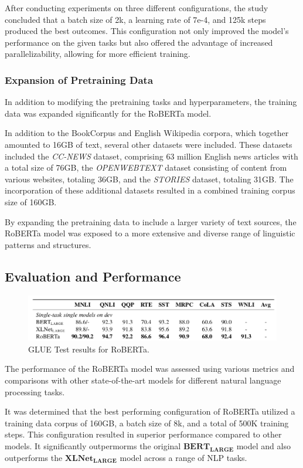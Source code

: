 \documentclass[a4paper,10pt]{report} %
\begin{document}
After conducting experiments on three different configurations, the study concluded that a batch size of 2k, a learning rate of 7e-4, and 125k steps produced the best outcomes. This configuration not only improved the model's performance on the given tasks but also offered the advantage of increased parallelizability, allowing for more efficient training. \cite{roberta}

\subsubsection{Expansion of Pretraining Data}
In addition to modifying the pretraining tasks and hyperparameters, the training data was expanded significantly for the RoBERTa model.

In addition to the BookCorpus and English Wikipedia corpora, which together amounted to 16GB of text, several other datasets were included. These datasets included the \textit{CC-NEWS} dataset, comprising 63 million English news articles with a total size of 76GB, the \textit{OPENWEBTEXT} dataset consisting of content from various websites, totaling 36GB, and the \textit{STORIES} dataset, totaling 31GB. The incorporation of these additional datasets resulted in a combined training corpus size of 160GB.

By expanding the pretraining data to include a larger variety of text sources, the RoBERTa model was exposed to a more extensive and diverse range of linguistic patterns and structures. \cite{roberta}

\subsection{Evaluation and Performance}
\begin{figure}
  \centering
  \includegraphics[width=12cm]{img/roberta_results.png}
  \caption{GLUE Test results for RoBERTa. \cite{roberta}}
  \label{fig:roberta_results}
\end{figure}
The performance of the RoBERTa model was assessed using various metrics and comparisons with other state-of-the-art models for different natural language processing tasks.

It was determined that the best performing configuration of RoBERTa utilized a training data corpus of 160GB, a batch size of 8k, and a total of 500K training steps. This configuration resulted in superior performance compared to other models. It significantly outpermorms the original $\mathbf{BERT_{LARGE}}$ model and also outperforms the $\mathbf{XLNet_{LARGE}}$ model across a range of NLP tasks.
\end{document}
